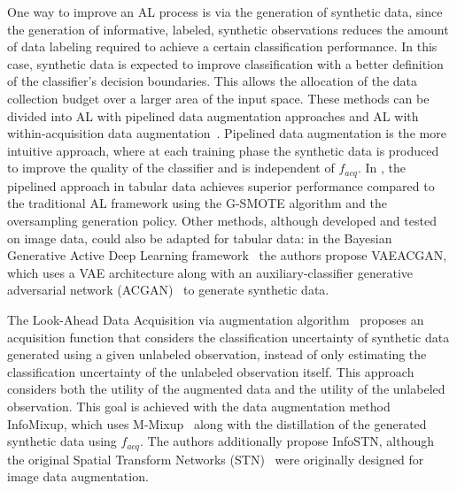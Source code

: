 One way to improve an AL process is via the generation of synthetic data,
since the generation of informative, labeled, synthetic observations reduces the amount
of data labeling required to achieve a certain classification performance. In
this case, synthetic data is expected to improve classification with a better
definition of the classifier's decision boundaries. This allows the allocation
of the data collection budget over a larger area of the input space. These
methods can be divided into AL with pipelined data augmentation approaches and
AL with within-acquisition data augmentation~\cite{kim2021lada}. Pipelined
data augmentation is the more intuitive approach, where at each training phase
the synthetic data is produced to improve the quality of the classifier and is
independent of $f_{acq}$. In \cite{fonseca2021increasing}, the pipelined
approach in tabular data achieves superior performance compared to the
traditional AL framework using the G-SMOTE algorithm and the oversampling
generation policy. Other methods, although developed and tested on image data,
could also be adapted for tabular data: in the Bayesian Generative Active Deep
Learning framework~\cite{tran2019bayesian} the authors propose VAEACGAN, which
uses a VAE architecture along with an auxiliary-classifier generative
adversarial network (ACGAN)~\cite{odena2017conditional} to generate synthetic
data.

The Look-Ahead Data Acquisition via augmentation algorithm~\cite{kim2021lada}
proposes an acquisition function that considers the classification uncertainty
of synthetic data generated using a given unlabeled observation, instead of
only estimating the classification uncertainty of the unlabeled observation
itself. This approach considers both the utility of the augmented data and the
utility of the unlabeled observation. This goal is achieved with the data
augmentation method InfoMixup, which uses M-Mixup~\cite{verma2019manifold}
along with the distillation of the generated synthetic data using $f_{acq}$.
The authors additionally propose InfoSTN, although the original Spatial
Transform Networks (STN)~\cite{jaderberg2015spatial} were originally designed
for image data augmentation.


% 
% 
% 
% 


